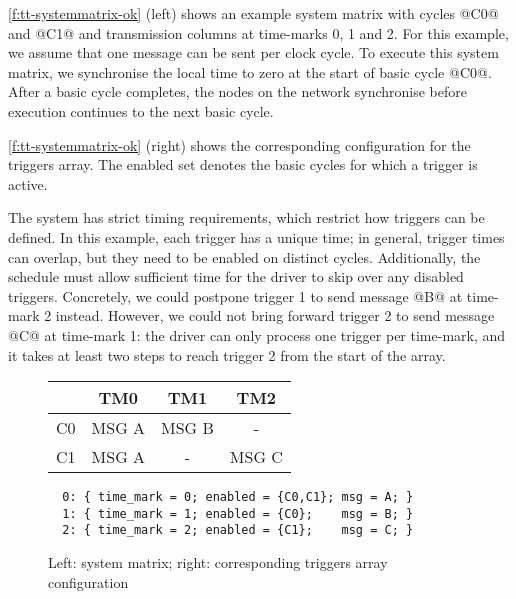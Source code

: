 \autoref{f:tt-systemmatrix-ok} (left) shows an example system matrix with cycles @C0@ and @C1@ and transmission columns at time-marks 0, 1 and 2.
For this example, we assume that one message can be sent per clock cycle.
To execute this system matrix, we synchronise the local time to zero at the start of basic cycle @C0@.
After a basic cycle completes, the nodes on the network synchronise before execution continues to the next basic cycle.

\autoref{f:tt-systemmatrix-ok} (right) shows the corresponding configuration for the triggers array.
The enabled set denotes the basic cycles for which a trigger is active.

The system has strict timing requirements, which restrict how triggers can be defined.
In this example, each trigger has a unique time; in general, trigger times can overlap, but they need to be enabled on distinct cycles.
Additionally, the schedule must allow sufficient time for the driver to skip over any disabled triggers.
Concretely, we could postpone trigger 1 to send message @B@ at time-mark 2 instead.
However, we could not bring forward trigger 2 to send message @C@ at time-mark 1: the driver can only process one trigger per time-mark, and it takes at least two steps to reach trigger 2 from the start of the array.

\begin{figure}
  \begin{minipage}{0.38\textwidth}
\begin{tabular}{r|ccc}
   & TM0 & TM1 & TM2 \\
  \hline
  C0 & MSG A & MSG B & - \\
  C1 & MSG A & - & MSG C
\end{tabular}
\end{minipage}
\begin{minipage}{0.6\textwidth}
\small
\begin{verbatim}
  0: { time_mark = 0; enabled = {C0,C1}; msg = A; }
  1: { time_mark = 1; enabled = {C0};    msg = B; }
  2: { time_mark = 2; enabled = {C1};    msg = C; }
\end{verbatim}
\end{minipage}
  
\caption{Left: system matrix; right: corresponding triggers array configuration}
\label{f:tt-systemmatrix-ok}
\end{figure}

